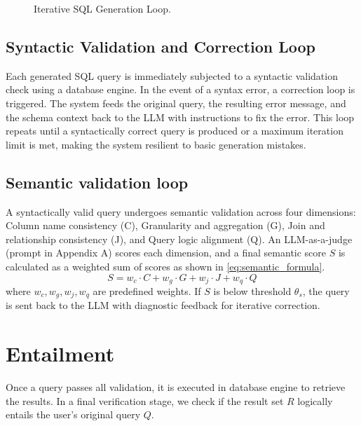 \documentclass[runningheads]{llncs}
\begin{document}
\begin{figure}[ht]
{
}
\caption{Iterative SQL Generation Loop.}
\label{fig:sql-gen-loop-tikz}
\end{figure}
\subsection{Syntactic Validation and Correction Loop}
Each generated SQL query is immediately subjected to a syntactic validation check using a database engine. In the event of a syntax error, a correction loop is triggered. The system feeds the original query, the resulting error message, and the schema context back to the LLM with instructions to fix the error. This loop repeats until a syntactically correct query is produced or a maximum iteration limit is met, making the system resilient to basic generation mistakes.

\subsection{Semantic validation loop}
A syntactically valid query undergoes semantic validation across four dimensions: Column name consistency (C), Granularity and aggregation (G), Join and relationship consistency (J), and Query logic alignment (Q). An LLM-as-a-judge (prompt in Appendix A) scores each dimension, and a final semantic score $S$ is calculated as a weighted sum of scores as shown in \ref{eq:semantic_formula}.
\begin{equation} \label{eq:semantic_formula}
S = w_c \cdot C + w_g \cdot G + w_j \cdot J + w_q \cdot Q 
\end{equation}
where $w_c, w_g, w_j, w_q$ are predefined weights. If $S$ is below threshold $\theta_s$, the query is sent back to the LLM with diagnostic feedback for iterative correction.

\section{Entailment}
Once a query passes all validation, it is executed in database engine to retrieve the results. In a final verification stage, we check if the result set $R$ logically entails the user's original query $Q$.
\end{document}
